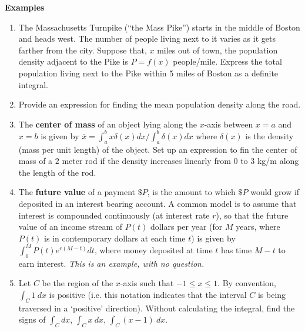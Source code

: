 \documentclass[12pt,letterpaper,noanswers]{exam}
\begin{document}
\noindent\textbf{Examples}
\begin{enumerate}
    \item The Massachusetts Turnpike (“the Mass Pike”) starts in the middle of Boston and heads west. The number of people living next to it varies as it gets farther from the city.  Suppose that, $x$ miles out of town, the population density adjacent to the Pike is $P = f(x)$ people/mile. Express the total population living next to the Pike within 5 miles of Boston as a definite integral.
    \vspace{1cm}
    
    \item Provide an expression for finding the mean population density along the road.
    \vspace{3cm}
    
    \item The \textbf{center of mass} of an object lying along the $x$-axis between $x=a$ and $x=b$ is given by $\bar{x} = \int_a^b x \delta(x) dx / \int_a^b \delta(x)dx$ where   $\delta(x)$ is the density (mass per unit length) of the object.  Set up an expression to fin the center of mass of a $2$ meter rod if the density increases linearly from $0$ to $3$ kg/m along the length of the rod.
    \vspace{4cm}
    
    \item The \textbf{future value} of a payment $\$P$, is the amount to which $\$P$ would grow if deposited in an interest bearing account.  A common model is to assume that interest is compounded continuously (at interest rate $r$), so that the future value of an income stream of $P(t)$ dollars per year (for $M$ years, where $P(t)$ is in contemporary dollars at each time $t$) is given by $\int_0^M P(t)e^{r(M-t)}dt$, where money deposited at time $t$ has time $M-t$ to earn interest.  \emph{This is an example, with no question.}
    \vspace{0.5cm}
    
    \item Let $C$ be the region of the $x$-axis such that $-1\leq x \leq 1$.  By convention, $\int_C 1\ dx$ is positive (i.e. this notation indicates that the interval $C$ is being traversed in a `positive' direction).  Without calculating the integral, find the signs of
   $\displaystyle\int_C dx$,
    $\displaystyle\int_C x\ dx$,
   $\displaystyle\int_C (x-1)\ dx$. %
   
   \vspace{2.5cm}
   

\end{enumerate}
\end{document}
